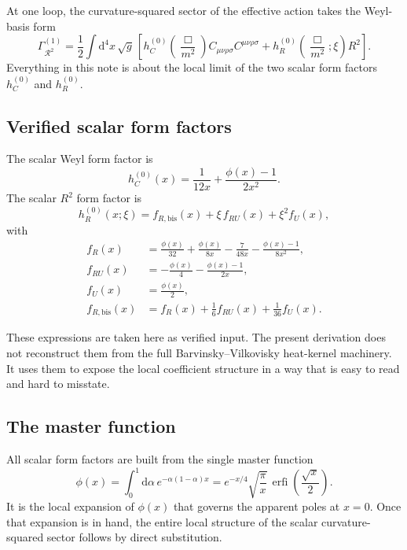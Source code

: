 \documentclass[11pt,a4paper]{article}
\newcommand{\dd}{\mathrm{d}}
\newcommand{\Weylsq}{C_{\mu\nu\rho\sigma}C^{\mu\nu\rho\sigma}}
\newcommand{\Rsq}{R^2}
\newcommand{\Boxop}{\Box}
\DeclareMathOperator{\erfi}{erfi}
\theoremstyle{definition}
\theoremstyle{remark}
\begin{document}
At one loop, the curvature-squared sector of the effective action takes the
Weyl-basis form
\begin{equation}
  \Gamma^{(1)}_{\mathcal R^2}
  = \frac{1}{2}\int \dd^4x\,\sqrt{g}\,
  \left[
    h_C^{(0)}\!\left(\frac{\Boxop}{m^2}\right)\Weylsq
    + h_R^{(0)}\!\left(\frac{\Boxop}{m^2};\xi\right)\Rsq
  \right].
  \label{eq:effective-action}
\end{equation}
Everything in this note is about the local limit of the two scalar form
factors $h_C^{(0)}$ and $h_R^{(0)}$.

\subsection{Verified scalar form factors}

The scalar Weyl form factor is
\begin{equation}
  h_C^{(0)}(x)
  = \frac{1}{12x} + \frac{\phi(x)-1}{2x^2}.
  \label{eq:hC-scalar}
\end{equation}
The scalar $R^2$ form factor is
\begin{equation}
  h_R^{(0)}(x;\xi)
  = f_{R,\mathrm{bis}}(x)
  + \xi\,f_{RU}(x)
  + \xi^2 f_U(x),
  \label{eq:hR-scalar}
\end{equation}
with
\begin{align}
  f_R(x)
  &= \frac{\phi(x)}{32}
   + \frac{\phi(x)}{8x}
   - \frac{7}{48x}
   - \frac{\phi(x)-1}{8x^2},
  \label{eq:fR}\\[4pt]
  f_{RU}(x)
  &= -\frac{\phi(x)}{4}
   - \frac{\phi(x)-1}{2x},
  \label{eq:fRU}\\[4pt]
  f_U(x)
  &= \frac{\phi(x)}{2},
  \label{eq:fU}\\[4pt]
  f_{R,\mathrm{bis}}(x)
  &= f_R(x) + \frac{1}{6}f_{RU}(x) + \frac{1}{36}f_U(x).
  \label{eq:fRbis}
\end{align}

These expressions are taken here as verified input.  The present derivation
does not reconstruct them from the full Barvinsky--Vilkovisky heat-kernel
machinery.  It uses them to expose the local coefficient structure in a way
that is easy to read and hard to misstate.

\subsection{The master function}

All scalar form factors are built from the single master function
\begin{equation}
  \phi(x)
  = \int_0^1 \dd\alpha\, e^{-\alpha(1-\alpha)x}
  = e^{-x/4}\sqrt{\frac{\pi}{x}}\,
    \erfi\!\left(\frac{\sqrt{x}}{2}\right).
  \label{eq:phi-def}
\end{equation}
It is the local expansion of $\phi(x)$ that governs the apparent poles at
$x=0$.  Once that expansion is in hand, the entire local structure of the
scalar curvature-squared sector follows by direct substitution.
\end{document}
